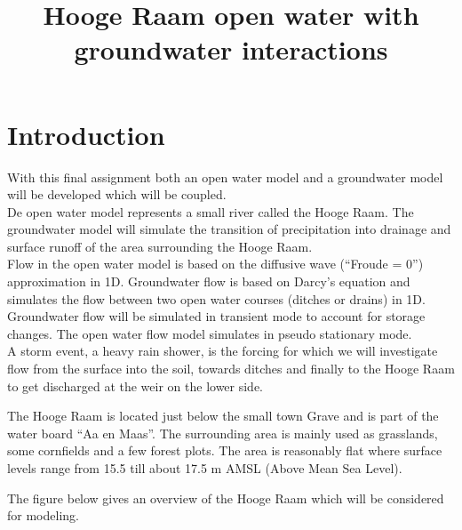 \documentclass[
]{article}
\title{Hooge Raam open water with groundwater interactions}
\author{}
\date{\vspace{-2.5em}}
\begin{document}
\maketitle

{
\setcounter{tocdepth}{2}
\tableofcontents
}
\hypertarget{introduction}{%
\section{Introduction}\label{introduction}}

With this final assignment both an open water model and a groundwater
model will be developed which will be coupled.\\
De open water model represents a small river called the Hooge Raam. The
groundwater model will simulate the transition of precipitation into
drainage and surface runoff of the area surrounding the Hooge Raam.\\
Flow in the open water model is based on the diffusive wave (``Froude =
0'') approximation in 1D. Groundwater flow is based on Darcy's equation
and simulates the flow between two open water courses (ditches or
drains) in 1D. Groundwater flow will be simulated in transient mode to
account for storage changes. The open water flow model simulates in
pseudo stationary mode.\\
A storm event, a heavy rain shower, is the forcing for which we will
investigate flow from the surface into the soil, towards ditches and
finally to the Hooge Raam to get discharged at the weir on the lower
side.

The Hooge Raam is located just below the small town Grave and is part of
the water board ``Aa en Maas''. The surrounding area is mainly used as
grasslands, some cornfields and a few forest plots. The area is
reasonably flat where surface levels range from 15.5 till about 17.5 m
AMSL (Above Mean Sea Level).

The figure below gives an overview of the Hooge Raam which will be
considered for modeling.
\end{document}
